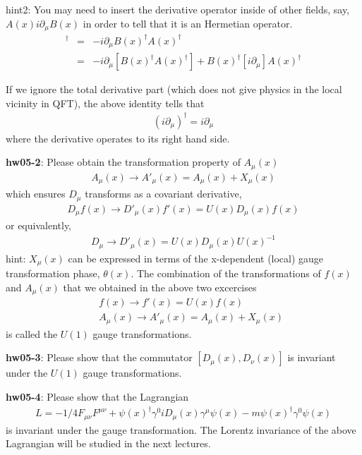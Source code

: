 \documentclass[12pt]{article}
\def\del{{\partial}}
\begin{document}
hint2: You may need to insert the derivative operator
    inside of other fields, say, $A(x) i \del _\mu B(x)$
    in order to tell that it is an Hermetian operator.
\begin{eqnarray}
    [ A(x) i\del_\mu B(x) ]^\dagger &=&
     -i \del_\mu B(x)^\dagger A(x)^\dagger \\
    &=& 
    -i \del_\mu [ B(x)^\dagger A(x)^\dagger ]
    + B(x)^\dagger [ i \del_\mu ] A(x)^\dagger
\end{eqnarray}        

    If we ignore the total derivative part (which does
    not give physics in the local vicinity in QFT), the
    above identity tells that
\begin{eqnarray}
    (i \del_\mu)^\dagger = i \del_\mu
\end{eqnarray}
 where the derivative operates to its right hand side.

{\bf hw05-2}:
  Please obtain the transformation property of $A_\mu(x)$
\begin{eqnarray}
    A_\mu(x) \to A'_\mu(x) = A_\mu(x) + X_\mu(x)
\end{eqnarray}
  which ensures $D_\mu$ transforms as a covariant derivative,
\begin{eqnarray}
    D_\mu f(x) \to D'_\mu(x) f'(x) = U(x) D_\mu(x) f(x)
\end{eqnarray}
 or equivalently,
\begin{eqnarray}
    D_\mu \to D'_\mu(x) = U(x) D_\mu(x) U(x)^{-1}
\end{eqnarray}
  hint: $X_\mu(x)$ can be expressed in terms of the x-dependent
        (local) gauge transformation phase, $\theta(x)$.
  The combination of the transformations of $f(x)$ and $A_\mu(x)$
  that we obtained in the above two excercises
\begin{eqnarray}
    &&f(x) \to f'(x) = U(x) f(x) \\
    &&A_\mu(x) \to A'_\mu(x) = A_\mu(x) + X_\mu(x)
\end{eqnarray}
 is called the $U(1)$ gauge transformations.

{\bf hw05-3}:
  Please show that the commutator
  $[ D_\mu(x), D_\nu(x) ]$
  is invariant under the $U(1)$ gauge transformations.

{\bf hw05-4}:
  Please show that the Lagrangian
  \begin{eqnarray}
    L = -1/4 F_{\mu\nu} F^{\mu\nu}
      + \psi(x)^\dagger \gamma^0 i D_\mu(x) \gamma^\mu \psi(x)
      - m \psi(x)^\dagger \gamma^0 \psi(x)
  \end{eqnarray}
  is invariant under the gauge transformation. The Lorentz
  invariance of the above Lagrangian will be studied in the
  next lectures.
\end{document}
